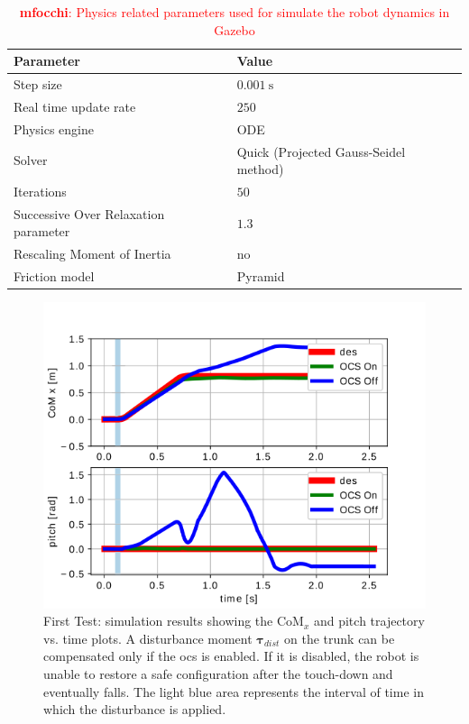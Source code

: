 \documentclass[sensors,article,submit,pdftex,moreauthors]{Definitions/mdpi}
\newcommand{\MF}[1]{\textcolor{red}{\textbf{mfocchi}: #1}}
\begin{document}
\begin{table}[t!] 
	\caption{\MF{Physics related parameters used for simulate the robot dynamics in Gazebo}}
	\label{tab:pys_param}
	\begin{tabularx}{\textwidth}{CC}
		\toprule
		\textbf{Parameter} & \textbf{Value} \\
		\midrule
		Step size & $0.001 \ \mathrm{s}$\\
		Real time update rate & $250$ \\
		Physics engine & ODE \\
		Solver & Quick (Projected Gauss-Seidel method)\\
		Iterations & $50$\\
		Successive Over Relaxation parameter & $1.3$\\
		Rescaling Moment of Inertia  & no \\
		Friction model & Pyramid \\		
		\bottomrule	\end{tabularx}
\end{table}
\begin{figure}[t]
	\centering
	\includegraphics[width=.7\linewidth]{figures/drawing.png}
	\caption{\small First Test: simulation results showing the $\mathrm{CoM}_x$ and pitch trajectory vs. time plots. A disturbance moment $\bm{\tau}_{dist}$ on the trunk can be compensated only if the \gls{ocs} is enabled. If it is disabled, the robot is unable to restore a safe configuration after the touch-down and eventually falls. The light blue area represents the interval of time in which the disturbance is applied.}
	\label{fig:fw_jump}
\end{figure}
\end{document}
